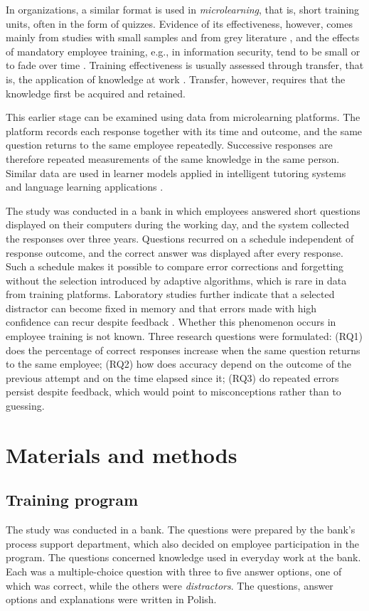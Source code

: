 \documentclass[preprint,12pt,authoryear]{elsarticle}
\begin{document}
In organizations, a similar format is used in \emph{microlearning}, that is, short training units,
often in the form of quizzes. Evidence of its effectiveness, however, comes mainly from studies with
small samples and from grey literature \citep{taylor2022}, and the effects of mandatory employee
training, e.g., in information security, tend to be small or to fade over time
\citep{reinheimer2020}. Training effectiveness is usually assessed through transfer, that is, the
application of knowledge at work \citep{blume2010}. Transfer, however, requires that the knowledge
first be acquired and retained.

This earlier stage can be examined using data from microlearning platforms. The platform records each
response together with its time and outcome, and the same question returns to the same employee
repeatedly. Successive responses are therefore repeated measurements of the same knowledge in the same
person. Similar data are used in learner models applied in intelligent tutoring systems and language
learning applications \citep{corbett1994,settles2016}.

The study was conducted in a bank in which employees answered short questions displayed on their
computers during the working day, and the system collected the responses over three years. Questions
recurred on a schedule independent of response outcome, and the correct answer was displayed after
every response. Such a schedule makes it possible to compare error corrections and forgetting without
the selection introduced by adaptive algorithms, which is rare in data from training platforms.
Laboratory studies further indicate that a selected distractor can become fixed in memory and that
errors made with high confidence can recur despite feedback \citep{butler2008,butler2011}. Whether this
phenomenon occurs in employee training is not known. Three research questions were formulated:
(RQ1) does the percentage of correct responses increase when the same question returns to the same
employee;
(RQ2) how does accuracy depend on the outcome of the previous attempt and on the time elapsed since it;
(RQ3) do repeated errors persist despite feedback, which would point to misconceptions rather than to
guessing.
\section{Materials and methods}

\subsection{Training program}
The study was conducted in a bank. The questions were prepared by the bank's process support
department, which also decided on employee participation in the program. The
questions concerned knowledge used in everyday work at the bank. Each was a multiple-choice question
with three to five answer options, one of which was correct, while the others were
\emph{distractors}. The questions, answer options and explanations were written in Polish.
\end{document}
